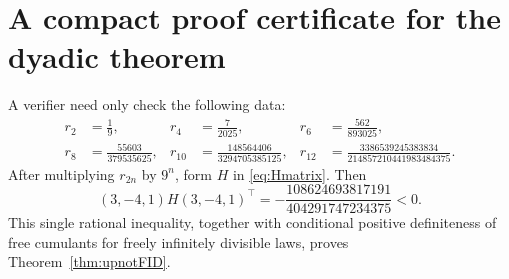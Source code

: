 \documentclass[11pt]{article}
\theoremstyle{definition}
\begin{document}
\section{A compact proof certificate for the dyadic theorem}
A verifier need only check the following data:
\begin{align*}
r_2&=\frac19,&
r_4&=\frac7{2025},&
r_6&=\frac{562}{893025},\\
r_8&=\frac{55603}{379535625},&
r_{10}&=\frac{148564406}{3294705385125},&
r_{12}&=\frac{3386539245383834}{214857210441983484375}.
\end{align*}
After multiplying \(r_{2n}\) by \(9^n\), form \(H\) in \eqref{eq:Hmatrix}. Then
\[
(3,-4,1)H(3,-4,1)^\top
=-\frac{108624693817191}{404291747234375}<0.
\]
This single rational inequality, together with conditional positive definiteness of free cumulants for freely infinitely divisible laws, proves Theorem~\ref{thm:upnotFID}.
\end{document}
